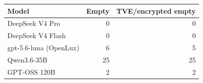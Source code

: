 \begin{tabular}{lrr}
\toprule
\textbf{Model} & \textbf{Empty} & \textbf{TVE/encrypted empty} \\
\midrule
DeepSeek V4 Pro & 0 & 0 \\
DeepSeek V4 Flash & 0 & 0 \\
gpt-5.6-luna (OpenLux) & 6 & 5 \\
Qwen3.6-35B & 25 & 25 \\
GPT-OSS 120B & 2 & 2 \\
\bottomrule
\end{tabular}
